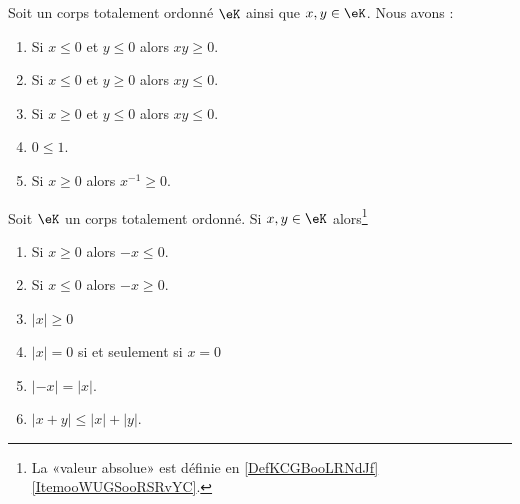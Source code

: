 \begin{lemma}        \label{LEMooXJTAooZauchx}
	Soit un corps totalement ordonné \( \eK\) ainsi que \( x,y\in \eK\). Nous avons :
	\begin{enumerate}
		\item
		      Si \( x\leq 0\) et \( y\leq 0\) alors \( xy\geq 0\).
		\item
		      Si \( x\leq 0\) et \( y\geq 0\) alors \( xy\leq 0\).
		\item
		      Si \( x\geq 0\) et \( y\leq 0\) alors \( xy\leq 0\).
		\item       \label{ITEMooRGYAooCUIfss}
		      \( 0\leq 1\).
		\item       \label{ITEMooMRNHooLglPKn}
		      Si \( x\geq 0\) alors \( x^{-1}\geq 0\).
	\end{enumerate}
\end{lemma}

\begin{lemma}  \label{LemooANTJooYxQZDw}
	Soit \( \eK\) un corps totalement ordonné. Si \( x,y\in \eK\) alors\footnote{La «valeur absolue» est définie en \eqref{DefKCGBooLRNdJf}\ref{ItemooWUGSooRSRvYC}.}
	\begin{enumerate}
		\item       \label{ItemooNVDIooSuiSoB}
		      Si \( x\geq 0\) alors \( -x\leq 0\).
		\item       \label{ITEMooVNAZooSxmtuH}
		      Si \( x\leq 0\) alors \( -x\geq 0\).
		\item       \label{ITEMooSDNHooDnjScE}
		      \( | x |\geq 0\)
		\item       \label{ITEMooLQLTooTJTPVM}
		      \( | x |=0\) si et seulement si \( x=0\)
		\item       \label{ITEMooVJAEooOEatzY}
		      \( | -x |=| x |\).
		\item\label{ItemooOMKNooRlanvk}
		      \( | x+y |\leq | x |+| y |\).
	\end{enumerate}
\end{lemma}

